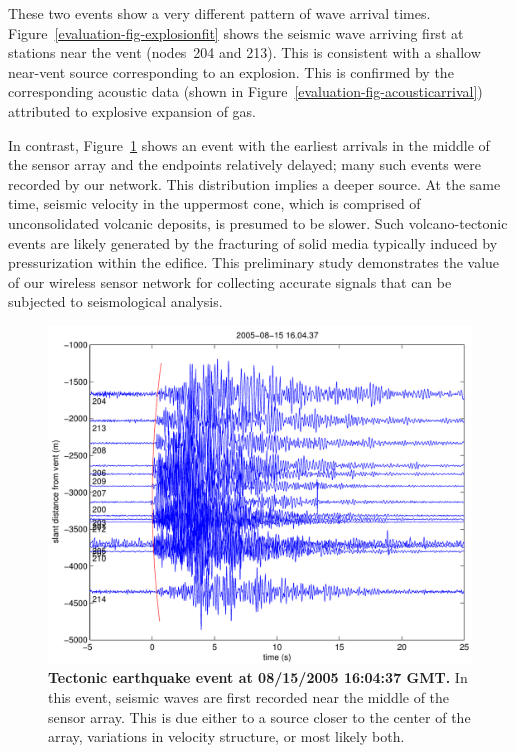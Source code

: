 These two events show a very different pattern of wave arrival times.
Figure~\ref{evaluation-fig-explosionfit} shows the seismic wave arriving first
at stations near the vent (nodes~204 and 213). This is consistent with a
shallow near-vent source corresponding to an explosion. This is confirmed by
the corresponding acoustic data (shown in
Figure~\ref{evaluation-fig-acousticarrival}) attributed to explosive
expansion of gas. 

In contrast, Figure~\ref{evaluation-fig-tectonicfit} shows an event with the
earliest arrivals in the middle of the sensor array and the endpoints
relatively delayed; many such events were recorded by our network. This
distribution implies a deeper source. At the same time, seismic velocity in
the uppermost cone, which is comprised of unconsolidated volcanic deposits,
is presumed to be slower. Such volcano-tectonic events are likely generated
by the fracturing of solid media typically induced by pressurization within
the edifice. This preliminary study demonstrates the value of our wireless
sensor network for collecting accurate signals that can be subjected to
seismological analysis.

\begin{figure}[t!]
\begin{center}
\includegraphics[width=0.8\hsize]{./3-evaluation/figs/tectonicfit.pdf}
\end{center}

\caption{\textbf{Tectonic earthquake event at 08/15/2005 16:04:37 GMT.} In
this event, seismic waves are first recorded near the middle of the sensor
array. This is due either to a source closer to the center of the array,
variations in velocity structure, or most likely both.}

\label{evaluation-fig-tectonicfit}
\end{figure}
